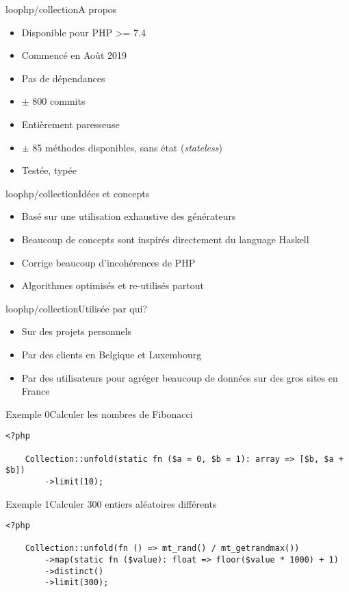 \begin{frame}{loophp/collection}{A propos}
    \begin{itemize}[<+->]
        \item Disponible pour PHP >= 7.4
        \item Commencé en Août 2019
        \item Pas de dépendances
        \item $\pm$ 800 commits
        \item Entièrement paresseuse
        \item $\pm$ 85 méthodes disponibles, sans état (\textit{stateless})
        \item Testée, typée
    \end{itemize}
\end{frame}

\begin{frame}{loophp/collection}{Idées et concepts}
    \begin{itemize}[<+->]
        \item Basé sur une utilisation exhaustive des générateurs
        \item Beaucoup de concepts sont inspirés directement du language Haskell
        \item Corrige beaucoup d'incohérences de PHP
        \item Algorithmes optimisés et re-utilisés partout
    \end{itemize}
\end{frame}

\begin{frame}{loophp/collection}{Utilisée par qui?}
    \begin{itemize}[<+->]
        \item Sur des projets personnels
        \item Par des clients en Belgique et Luxembourg
        \item Par des utilisateurs pour agréger beaucoup de données sur des gros
        sites en France
    \end{itemize}
\end{frame}

\begin{frame}[fragile]{Exemple 0}{Calculer les nombres de Fibonacci}
    \begin{lstlisting}[firstnumber=1]
    <?php

    Collection::unfold(static fn ($a = 0, $b = 1): array => [$b, $a + $b])
        ->limit(10);
    \end{lstlisting}
\end{frame}

\begin{frame}[fragile]{Exemple 1}{Calculer 300 entiers aléatoires différents}
    \begin{lstlisting}[firstnumber=1]
    <?php

    Collection::unfold(fn () => mt_rand() / mt_getrandmax())
        ->map(static fn ($value): float => floor($value * 1000) + 1)
        ->distinct()
        ->limit(300);
    \end{lstlisting}
\end{frame}
